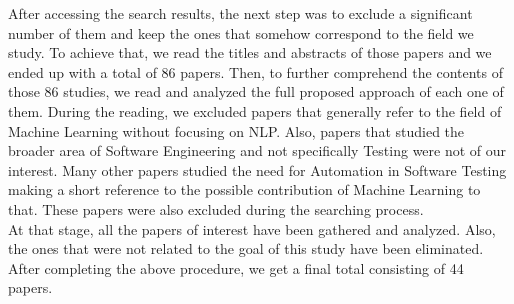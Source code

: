 After accessing the search results, the next step was to exclude a significant number of them and keep the ones that somehow correspond to the field we study. 
To achieve that, we read the titles and abstracts of those papers and we ended up with a total of 86 papers. Then, to further comprehend the contents of those 86 studies, 
we read and analyzed the full proposed approach of each one of them. During the reading, we excluded papers that generally refer to the field of 
Machine Learning without focusing on NLP. Also, papers that studied the broader area of Software Engineering and not specifically Testing were not 
of our interest. Many other papers studied the need for Automation in Software Testing making a short reference to the possible contribution of Machine 
Learning to that. These papers were also excluded during the searching process. \\

At that stage, all the papers of interest have been gathered and analyzed. Also, the ones that were not related to the goal of this study have been 
eliminated. After completing the above procedure, we get a final total consisting of 44 papers. 